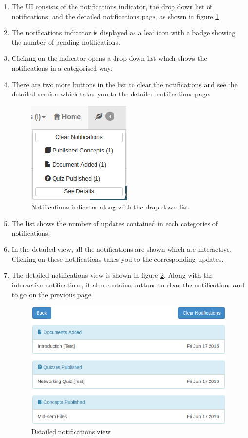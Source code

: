 \begin{enumerate}
	\item The UI consists of the notifications indicator, the drop down list of notifications, and the detailed notifications page, as shown in figure \ref{fig:notifications_ui}
	\item The notifications indicator is displayed as a leaf icon with a badge showing the number of pending notifications.
	\item Clicking on the indicator opens a drop down list which shows the notifications in a categorised way.
	\item There are two more buttons in the list to clear the notifications and see the detailed version which takes you to the detailed notifications page.
	\begin{figure}[h]
		\centering
		\includegraphics[width=0.3\linewidth]{./media/notifications_ui}
		\caption{Notifications indicator along with the drop down list}
		\label{fig:notifications_ui}
	\end{figure}
	\item The list shows the number of updates contained in each categories of notifications.
	\item In the detailed view, all the notifications are shown which are interactive. Clicking on these notifications takes you to the corresponding updates.
	\item The detailed notifications view is shown in figure \ref{fig:notifications_detailed}. Along with the interactive notifications, it also contains buttons to clear the notifications and to go on the previous page.
	\begin{figure}[h]
		\centering
		\includegraphics[width=0.7\linewidth]{./media/notifications_detailed}
		\caption{Detailed notifications view}
		\label{fig:notifications_detailed}
	\end{figure}
\end{enumerate}


